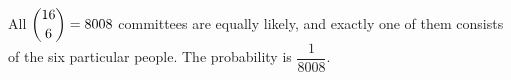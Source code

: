 All $\dbinom{16}{6}=8008$ committees are equally likely, and exactly one of them consists of the six particular people. The probability is $\boxed{\dfrac{1}{8008}}$.
